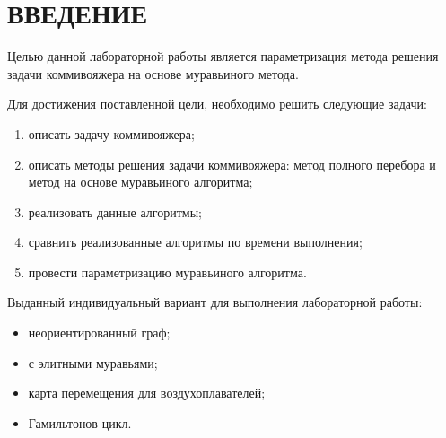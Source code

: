 \chapter*{ВВЕДЕНИЕ}

Целью данной лабораторной работы является параметризация метода решения задачи коммивояжера на основе муравьиного метода.

Для достижения поставленной цели, необходимо решить следующие задачи:
\begin{enumerate}
	\item описать задачу коммивояжера;
	\item описать методы решения задачи коммивояжера: метод полного перебора и метод на основе муравьиного алгоритма;
	\item реализовать данные алгоритмы;
	\item сравнить реализованные алгоритмы по времени выполнения;
	\item провести параметризацию муравьиного алгоритма.
\end{enumerate}

Выданный индивидуальный вариант для выполнения лабораторной работы:
\begin{itemize}
	\item неориентированный граф;
	\item с элитными муравьями;
	\item карта перемещения для воздухоплавателей;
	\item Гамильтонов цикл.
\end{itemize}
	